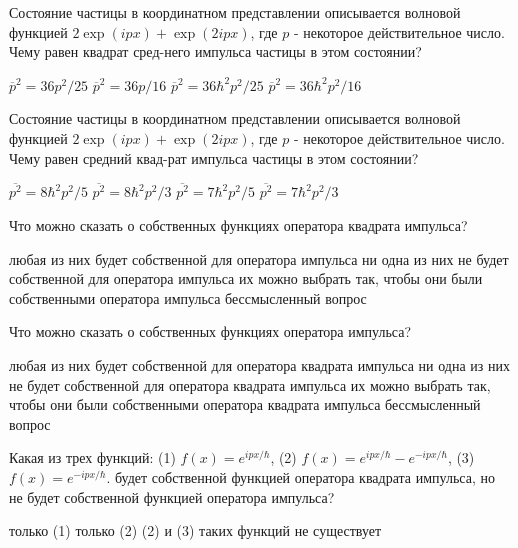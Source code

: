 \documentclass[11pt,a4paper]{exam}
\begin{document}
\begin{questions}
\question Состояние частицы в координатном представлении описывается волновой функцией $2\exp (ipx) + \exp (2ipx)$, где $p$ - некоторое действительное число. Чему равен квадрат сред-него импульса частицы в этом состоянии?
\begin{choices}
\choice ${\overline p ^2} = 36{p^2}/25$   
\choice ${\overline p ^2} = 36p/16$ 
\choice ${\overline p ^2} = 36{\hbar ^2}{p^2}/25$  
\choice ${\overline p ^2} = 36{\hbar ^2}{p^2}/16$ 
\end{choices}

\question Состояние частицы в координатном представлении описывается волновой функцией $2\exp (ipx) + \exp (2ipx)$, где $p$ - некоторое действительное число. Чему равен средний квад-рат импульса частицы в этом состоянии?
\begin{choices}
\choice $\overline {{p^2}}  = 8{\hbar ^2}{p^2}/5$  
\choice $\overline {{p^2}}  = 8{\hbar ^2}{p^2}/3$  
\choice $\overline {{p^2}}  = 7{\hbar ^2}{p^2}/5$  
\choice $\overline {{p^2}}  = 7{\hbar ^2}{p^2}/3$ 
\end{choices}

\question Что можно сказать о собственных функциях оператора квадрата импульса? 
\begin{choices}
\choice любая из них будет собственной для оператора импульса
\choice ни одна из них не будет собственной для оператора импульса
\choice их можно выбрать так, чтобы они были собственными оператора импульса
\choice бессмысленный вопрос
\end{choices}

\question Что можно сказать о собственных функциях оператора импульса? 
\begin{choices}
\choice любая из них будет собственной для оператора квадрата импульса
\choice ни одна из них не будет собственной для оператора квадрата импульса
\choice их можно выбрать так, чтобы они были собственными оператора квадрата импульса
\choice бессмысленный вопрос
\end{choices}

\question Какая из трех функций: 
(1) $f(x) = {e^{ipx/\hbar }}$, (2) $f(x) = {e^{ipx/\hbar }} - {e^{ - ipx/\hbar }}$, (3) $f(x) = {e^{ - ipx/\hbar }}$. 
будет собственной функцией оператора квадрата импульса, но не будет собственной функцией оператора импульса?
\begin{choices}
\choice только (1)      
\choice только (2)      
\choice (2) и (3)       
\choice таких функций не существует
\end{choices}


\end{questions}
\end{document}
